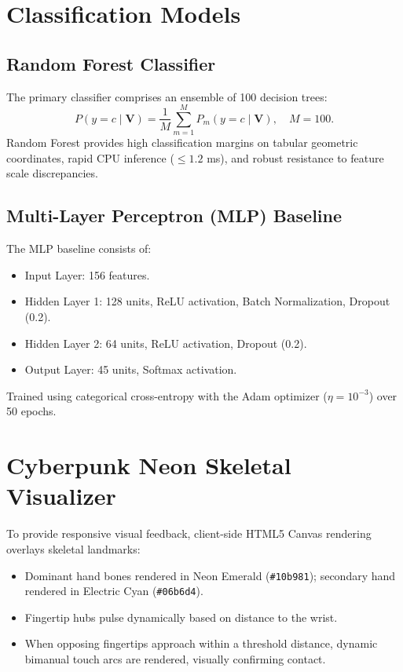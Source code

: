 \section{Classification Models}
\subsection{Random Forest Classifier}
The primary classifier comprises an ensemble of 100 decision trees:
\[
P(y = c \mid \mathbf{V}) = \frac{1}{M} \sum_{m=1}^M P_m(y = c \mid \mathbf{V}), \quad M = 100.
\]
Random Forest provides high classification margins on tabular geometric coordinates, rapid CPU inference ($\le 1.2$ ms), and robust resistance to feature scale discrepancies.

\subsection{Multi-Layer Perceptron (MLP) Baseline}
The MLP baseline consists of:
\begin{itemize}
\item Input Layer: 156 features.
\item Hidden Layer 1: 128 units, ReLU activation, Batch Normalization, Dropout (0.2).
\item Hidden Layer 2: 64 units, ReLU activation, Dropout (0.2).
\item Output Layer: 45 units, Softmax activation.
\end{itemize}
Trained using categorical cross-entropy with the Adam optimizer ($\eta = 10^{-3}$) over 50 epochs.

\section{Cyberpunk Neon Skeletal Visualizer}
To provide responsive visual feedback, client-side HTML5 Canvas rendering overlays skeletal landmarks:
\begin{itemize}
\item Dominant hand bones rendered in Neon Emerald (\texttt{\#10b981}); secondary hand rendered in Electric Cyan (\texttt{\#06b6d4}).
\item Fingertip hubs pulse dynamically based on distance to the wrist.
\item When opposing fingertips approach within a threshold distance, dynamic bimanual touch arcs are rendered, visually confirming contact.
\end{itemize}


